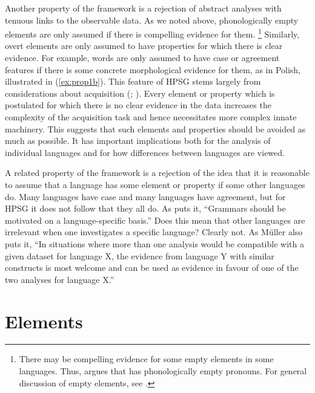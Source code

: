\documentclass[output=paper
	        ,collection
	        ,collectionchapter
 	        ,biblatex
                ,babelshorthands
                ,newtxmath
                ,draftmode
                ,colorlinks, citecolor=brown
]{langscibook}
\begin{document}
Another property of the framework is a rejection of abstract analyses with tenuous links to the observable data. As we noted above, phonologically empty elements are only assumed if there is compelling evidence for them.%
%
\footnote{There may be compelling evidence for some empty elements in some languages. Thus, \citet[Section~8]{Borsley2009a-u} argues that  has phonologically empty pronouns. For general discussion of empty elements, see \citet[Chapter~19.2]{MuellerGT-Eng1}.}
%
Similarly, overt elements are only assumed to have properties for which there is clear evidence. For example, words are only assumed to have case or agreement features if there is some concrete morphological evidence for them, as in Polish, illustrated in (\ref{ex:prop1b}). This feature of HPSG stems largely from considerations about acquisition (\citealt[Chapter~19]{MuellerGT-Eng1}; %
). Every element or property which is postulated for which there is no clear evidence in the data increases the complexity of the acquisition task and hence necessitates more complex innate machinery. This suggests that such elements and properties should be avoided as much as possible. It has important implications both for the analysis of individual languages and for how differences between languages are viewed.
	
A related property of the framework is a rejection of the idea that it is reasonable to assume that a language has some element or property if some other languages do. Many languages have case and many languages have agreement, but for HPSG it does not follow that they all do. As \citet[25]{MuellerCoreGram} puts it, “Grammars should be motivated on a language-specific basis.” Does this mean that other languages are irrelevant when one investigates a specific language? Clearly not. As Müller also puts it, “In situations where more than one analysis would be compatible with a given dataset for language X, the evidence from language Y with similar constructs is most welcome and can be used as evidence in favour of one of the two analyses for language X.” \citep[43]{MuellerCoreGram}


\section{Elements}\label{sec:prop3}
\label{prop:sec-elements}
\end{document}
